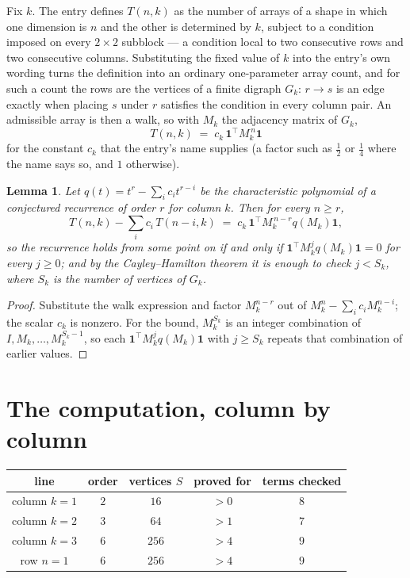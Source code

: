 \documentclass[11pt,a4paper]{article}
\theoremstyle{plain}
\newtheorem{lemma}[theorem]{Lemma}
\theoremstyle{definition}
\begin{document}
Fix $k$. The entry defines $T(n,k)$ as the number of arrays of a shape in which one dimension
is $n$ and the other is determined by $k$, subject to a condition imposed on every
$2\times2$ subblock --- a condition local to two consecutive rows and two consecutive columns.
Substituting the fixed value of $k$ into the entry's own wording turns the definition into an
ordinary one-parameter array count, and for such a count the rows are the vertices of a finite
digraph $G_k$: $r\to s$ is an edge exactly when placing $s$ under $r$ satisfies the condition
in every column pair. An admissible array is then a walk, so with $M_k$ the adjacency matrix
of $G_k$,
\[
T(n,k)\;=\;c_k\,\mathbf{1}^{\!\top}M_k^{\,n}\mathbf{1}
\]
for the constant $c_k$ that the entry's name supplies (a factor such as $\tfrac12$ or
$\tfrac14$ where the name says so, and $1$ otherwise).

\begin{lemma}\label{lem:crit}
Let $q(t)=t^{r}-\sum_i c_it^{r-i}$ be the characteristic polynomial of a conjectured
recurrence of order $r$ for column $k$. Then for every $n\ge r$,
\[
T(n,k)-\sum_i c_i\,T(n-i,k)\;=\;c_k\,\mathbf{1}^{\!\top}M_k^{\,n-r}q(M_k)\mathbf{1},
\]
so the recurrence holds from some point on if and only if
$\mathbf{1}^{\!\top}M_k^{j}q(M_k)\mathbf{1}=0$ for every $j\ge0$; and by the
Cayley--Hamilton theorem it is enough to check $j<S_k$, where $S_k$ is the number of vertices
of $G_k$.
\end{lemma}

\begin{proof}
Substitute the walk expression and factor $M_k^{n-r}$ out of $M_k^{n}-\sum_ic_iM_k^{n-i}$;
the scalar $c_k$ is nonzero. For the bound, $M_k^{S_k}$ is an integer combination of
$I,M_k,\dots,M_k^{S_k-1}$, so each $\mathbf{1}^{\!\top}M_k^{j}q(M_k)\mathbf{1}$ with
$j\ge S_k$ repeats that combination of earlier values.
\end{proof}

\section{The computation, column by column}

\begin{center}
\begin{tabular}{ccccc}
line & order & vertices $S$ & proved for & terms checked \\ \hline
column $k$$=1$ & $2$ & $16$ & $>0$ & $8$ \\
column $k$$=2$ & $3$ & $64$ & $>1$ & $7$ \\
column $k$$=3$ & $6$ & $256$ & $>4$ & $9$ \\
row $n$$=1$ & $6$ & $256$ & $>4$ & $9$ \\
\end{tabular}
\end{center}
\end{document}
